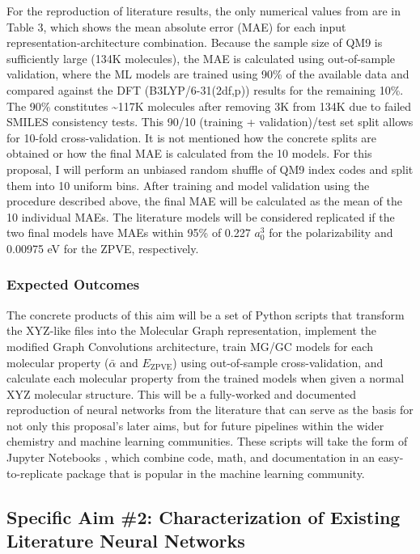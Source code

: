 \documentclass[12pt]{article}
\begin{document}
For the reproduction of literature results, the only numerical values from \parencite{2017arXiv170205532F} are in Table 3, which shows the mean absolute error (MAE) for each input representation-architecture combination. Because the sample size of QM9 is sufficiently large (134K molecules), the MAE is calculated using out-of-sample validation, where the ML models are trained using 90\% of the available data and compared against the DFT (B3LYP/6-31(2df,p)) results for the remaining 10\%. The 90\% constitutes \textasciitilde{}117K molecules after removing 3K from 134K due to failed SMILES consistency tests. This 90/10 (training + validation)/test set split allows for 10-fold cross-validation. It is not mentioned how the concrete splits are obtained or how the final MAE is calculated from the 10 models. For this proposal, I will perform an unbiased random shuffle of QM9 index codes and split them into 10 uniform bins. After training and model validation using the procedure described above, the final MAE will be calculated as the mean of the 10 individual MAEs. The literature models will be considered replicated if the two final models have MAEs within 95\% of 0.227 \(a_{0}^{3}\) for the polarizability and 0.00975 eV for the ZPVE, respectively.

\subsubsection{Expected Outcomes}
\label{sec:orgf08c63b}

The concrete products of this aim will be a set of Python scripts that transform the XYZ-like files into the Molecular Graph representation, implement the modified Graph Convolutions architecture, train MG/GC models for each molecular property (\(\bar{\alpha}\) and \(E_\text{ZPVE}\)) using out-of-sample cross-validation, and calculate each molecular property from the trained models when given a normal XYZ molecular structure. This will be a fully-worked and documented reproduction of neural networks from the literature that can serve as the basis for not only this proposal's later aims, but for future pipelines within the wider chemistry and machine learning communities. These scripts will take the form of Jupyter Notebooks \cite{jupyter,PER-GRA:2007}, which combine code, math, and documentation in an easy-to-replicate package that is popular in the machine learning community.

\subsection{Specific Aim \#2: Characterization of Existing Literature Neural Networks}
\label{sec:orgefba56a}
\end{document}
